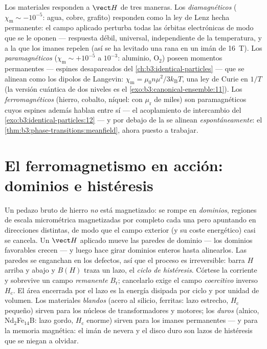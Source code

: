 \begin{remark}\label{rem:b3:electromagnetism-in-matter:zoo}
Los materiales responden a $\vect H$ de tres maneras.
Los \emph{diamagnéticos} ($\chi_{\text{m}} \sim -10^{-5}$: agua, cobre,
grafito) responden como la ley de Lenz hecha permanente: el campo aplicado
perturba todas las órbitas electrónicas de modo que se le oponen --- respuesta débil, universal,
independiente de la temperatura, y a la que los imanes repelen (así se ha levitado
una rana en un imán de \qty{16}{T}).
Los \emph{paramagnéticos} ($\chi_{\text{m}} \sim +10^{-5}$ a $10^{-3}$:
aluminio, O$_2$) poseen momentos permanentes --- espines desapareados del
\cref{ch:b3:identical-particles} --- que se alinean como los dipolos de
Langevin: $\chi_{\text{m}} = \mu_0 n\mu^2/3k_{\text{B}}T$, una ley de Curie
en $1/T$ (la versión cuántica de dos niveles es el
\cref{exo:b3:canonical-ensemble:11}).
Los \emph{ferromagnéticos} (hierro, cobalto, níquel: con $\mu_{\text{r}}$ de
miles) son paramagnéticos cuyos espines además hablan entre sí ---
el acoplamiento de intercambio del \cref{exo:b3:identical-particles:12} ---
y por debajo de la  se alinean \emph{espontáneamente}:
el \cref{thm:b3:phase-transitions:meanfield}, ahora puesto a trabajar.
\end{remark}

\section{El ferromagnetismo en acción: dominios e histéresis}

\begin{definition}\label{def:b3:electromagnetism-in-matter:hysteresis}
Un pedazo bruto de hierro \emph{no} está magnetizado: se rompe en
\emph{dominios}, regiones de escala micrométrica magnetizadas por completo cada una pero
apuntando en direcciones distintas, de modo que el campo exterior (y su coste energético)
casi se cancela. Un $\vect H$ aplicado mueve las paredes de dominio ---
los dominios favorables crecen --- y luego hace girar dominios enteros hasta
alinearlos. Las paredes se enganchan en los defectos, así que el proceso es irreversible: barra
$H$ arriba y abajo y $B(H)$ traza un lazo, el \emph{ciclo de
histéresis}. Córtese la corriente y sobrevive un campo \emph{remanente}
$B_{\text{r}}$; cancelarlo exige el campo \emph{coercitivo} inverso
$H_{\text{c}}$. El área encerrada por el lazo es la
energía disipada por ciclo y por unidad de volumen. Los materiales \emph{blandos}
(acero al silicio, ferritas: lazo estrecho, $H_{\text{c}}$ pequeño) sirven para los
núcleos de transformadores y motores; los \emph{duros}
(alnico, Nd$_2$Fe$_{14}$B: lazo gordo, $H_{\text{c}}$ enorme) sirven para los
imanes permanentes --- y para la memoria magnética: el imán de nevera
y el disco duro son lazos de histéresis que se niegan a olvidar.
\end{definition}

